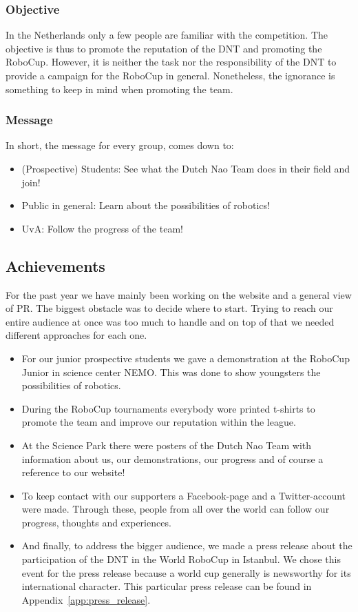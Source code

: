 \documentclass[11pt,a4paper,oneside]{article}
\begin{document}
\subsubsection{Objective}
In the Netherlands only a few people are familiar with the competition. The objective is thus to promote the reputation of the DNT and promoting the RoboCup. However, it is neither the task nor the responsibility of the DNT to provide a campaign for the RoboCup in general. Nonetheless, the ignorance is something to keep in mind when promoting the team.

\subsubsection{Message}
In short, the message for every group, comes down to:
\begin{itemize}
\item (Prospective) Students: See what the Dutch Nao Team does in their field and join!
\item Public in general: Learn about the possibilities of robotics!
\item UvA: Follow the progress of the team!
\end{itemize}

\subsection{Achievements}
For the past year we have mainly been working on the website and a general view of PR. The biggest obstacle was to decide where to start. Trying to reach our entire audience at once was too much to handle and on top of that we needed different approaches for each one.
\begin{itemize}
\item For our junior prospective students we gave a demonstration at the RoboCup Junior in science center NEMO. This was done to show youngsters the possibilities of robotics.
\item During the RoboCup tournaments everybody wore printed t-shirts to promote the team and improve our reputation within the league. 
\item At the Science Park there were posters of the Dutch Nao Team with information about us, our demonstrations, our progress and of course a reference to our website!
\item To keep contact with our supporters a Facebook-page and a Twitter-account were made. Through these, people from all over the world can follow our progress, thoughts and experiences.
\item And finally, to address the bigger audience, we made a press release about the participation of the DNT in the World RoboCup in Istanbul. We chose this event for the press release because a world cup generally is newsworthy for its international character. This particular press release can be found in Appendix~\ref{app:press_release}.
\end{itemize}
\end{document}
